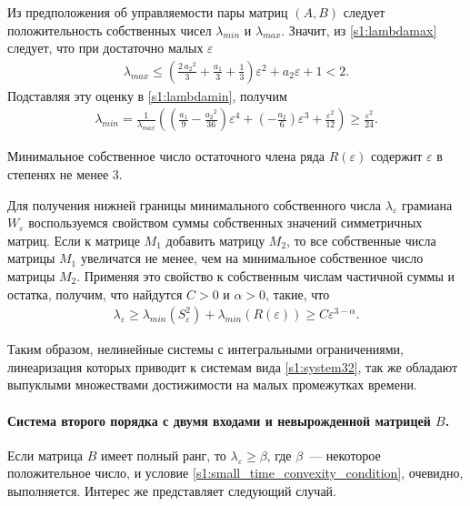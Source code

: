 \documentclass[../main.tex]{subfiles}
\begin{document}
Из предположения об управляемости пары матриц $ (A,B) $ следует положительность собственных чисел $ \lambda_{min} $ и $ \lambda_{max} $.
Значит, из \eqref{s1:lambdamax} следует, что при достаточно малых $\varepsilon$
\begin{gather*}
    \lambda_{max} \leqslant \left(\frac{2\,{a_{2}}^2}{3}+\frac{a_{1}}{3}+\frac{1}{3}\right)\varepsilon^2+a_{2}\varepsilon+1 < 2.
\end{gather*}
Подставляя эту оценку в \eqref{s1:lambdamin}, получим
\begin{gather*}
     \lambda_{min} = \frac{1}{\lambda_{max}}\left(  \left(\frac{a_{1}}{9}-\frac{{a_{2}}^2}{36}\right)\varepsilon^4+\left(-\frac{a_{2}}{6}\right)\varepsilon^3+\frac{\varepsilon^2}{12}\right) \geqslant\frac{\varepsilon^2}{24}.
\end{gather*}
 
Минимальное собственное число остаточного члена ряда $ R(\varepsilon) $ содержит $ \varepsilon $ в степенях не менее 3.
 
Для получения нижней границы минимального собственного числа $ \lambda_{\varepsilon} $ грамиана $ W_{\varepsilon}$ воспользуемся свойством суммы собственных значений симметричных матриц\cite{Wilkinson}.
Если к матрице $ M_1 $ добавить матрицу $ M_2 $, то все собственные числа матрицы $ M_1 $ увеличатся не менее, чем на минимальное собственное число матрицы $ M_2 $.
Применяя это свойство к собственным числам частичной суммы и остатка, получим, что найдутся $C > 0$ и $\alpha > 0 $, такие, что
\begin{gather}
    \lambda_{\varepsilon} \geqslant \lambda_{min}(S_{\varepsilon}^{2}) + \lambda_{min}(R(\varepsilon)) \geqslant  C \varepsilon^{3-\alpha}.
\end{gather}
 
Таким образом, нелинейные системы с интегральными ограничениями, линеаризация которых приводит к системам вида \eqref{s1:system32},  так же обладают выпуклыми множествами достижимости на малых промежутках времени.

\paragraph{Система второго порядка с двумя входами и невырожденной матрицей $B$.}
Если матрица $ B $ имеет полный ранг, то $\lambda_{\varepsilon} \geqslant \beta $, где $ \beta $~--- некоторое положительное число, и условие \eqref{s1:small_time_convexity_condition}, очевидно, выполняется.
Интерес же представляет следующий случай.
\end{document}
